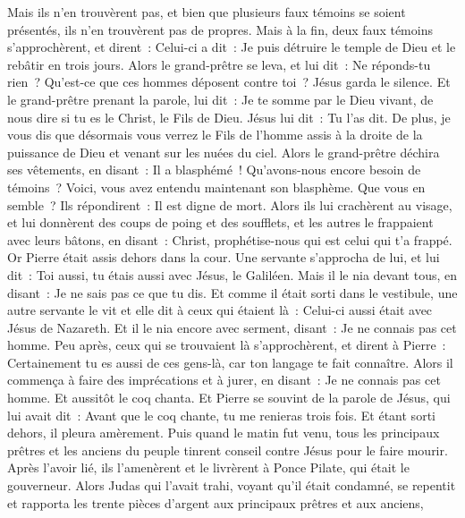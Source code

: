 \begin{multicols}{2}
Mais ils n'en trouvèrent pas, et bien que plusieurs faux témoins se soient présentés, ils n'en trouvèrent pas de propres. Mais à la fin, deux faux témoins s'approchèrent,
et dirent~: Celui-ci a dit~: Je puis détruire le temple de Dieu et le rebâtir en trois jours.
Alors le grand-prêtre se leva, et lui dit~: Ne réponds-tu rien~? Qu'est-ce que ces hommes déposent contre toi~?
Jésus garda le silence. Et le grand-prêtre prenant la parole, lui dit~: Je te somme par le Dieu vivant, de nous dire si tu es le Christ, le Fils de Dieu.
Jésus lui dit~: Tu l'as dit. De plus, je vous dis que désormais vous verrez le Fils de l'homme assis à la droite de la puissance de Dieu et venant sur les nuées du ciel.
Alors le grand-prêtre déchira ses vêtements, en disant~: Il a blasphémé~! Qu'avons-nous encore besoin de témoins~? Voici, vous avez entendu maintenant son blasphème. Que vous en semble~?
Ils répondirent~: Il est digne de mort.
Alors ils lui crachèrent au visage, et lui donnèrent des coups de poing et des soufflets, et les autres le frappaient avec leurs bâtons,
en disant~: Christ, prophétise-nous qui est celui qui t'a frappé.
Or Pierre était assis dehors dans la cour. Une servante s'approcha de lui, et lui dit~: Toi aussi, tu étais aussi avec Jésus, le Galiléen.
Mais il le nia devant tous, en disant~: Je ne sais pas ce que tu dis.
Et comme il était sorti dans le vestibule, une autre servante le vit et elle dit à ceux qui étaient là~: Celui-ci aussi était avec Jésus de Nazareth.
Et il le nia encore avec serment, disant~: Je ne connais pas cet homme.
Peu après, ceux qui se trouvaient là s'approchèrent, et dirent à Pierre~: Certainement tu es aussi de ces gens-là, car ton langage te fait connaître.
Alors il commença à faire des imprécations et à jurer, en disant~: Je ne connais pas cet homme. Et aussitôt le coq chanta.
Et Pierre se souvint de la parole de Jésus, qui lui avait dit~: Avant que le coq chante, tu me renieras trois fois. Et étant sorti dehors, il pleura amèrement.
\VerseOne{}Puis quand le matin fut venu, tous les principaux prêtres et les anciens du peuple tinrent conseil contre Jésus pour le faire mourir.
Après l'avoir lié, ils l'amenèrent et le livrèrent à Ponce Pilate, qui était le gouverneur.
Alors Judas qui l'avait trahi, voyant qu'il était condamné, se repentit et rapporta les trente pièces d'argent aux principaux prêtres et aux anciens,

\end{multicols}
